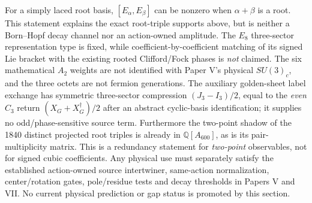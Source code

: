 \documentclass[11pt]{article}
\begin{document}
\begin{remark}
\label{p1:rem:v370-e8-readout-boundary}
For a simply laced root basis, $[E_\alpha,E_\beta]$ can be nonzero
when $\alpha+\beta$ is a root.  This statement explains the exact
root-triple supports above, but is neither a Born--Hopf decay channel
nor an action-owned amplitude.  The $E_8$ three-sector representation
type is fixed, while coefficient-by-coefficient matching of its signed
Lie bracket with the existing rooted Clifford/Fock phases is \emph{not}
claimed.  The six mathematical $A_2$ weights are not identified with
Paper V's physical $SU(3)_c$, and the three octets are not fermion
generations.  The auxiliary golden-sheet label exchange has symmetric
three-sector compression $(J_3-I_3)/2$, equal to the \emph{even}
$C_3$ return $(X_G+X_G^\dagger)/2$ after an abstract cyclic-basis
identification; it supplies no odd/phase-sensitive source term.
Furthermore the two-point shadow of the 1840 distinct projected
root triples is already in $\mathbb Q[A_{600}]$, as is its
pair-multiplicity matrix.  This is a redundancy statement for
\emph{two-point} observables, not for signed cubic coefficients.
Any physical use must separately satisfy the established action-owned
source intertwiner, same-action normalization, center/rotation gates,
pole/residue tests and decay thresholds in Papers V and VII.  No
current physical prediction or gap status is promoted by this section.
\end{remark}


\clearpage


\end{document}
